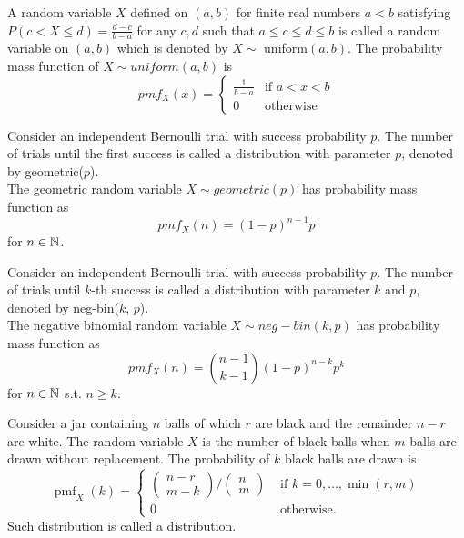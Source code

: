 \documentclass[11pt]{article}
\begin{document}
A random variable $X$ defined on $(a,b)$ for finite real numbers $a < b$ satisfying $P(c < X \leq d) = \frac{d-c}{b-a}$ for any $c,d$ such that $a\leq c \leq d\leq b$ is called a  random variable on $(a,b)$ which is denoted by $X \sim$ uniform$(a,b)$.
The probability mass function of $X \sim uniform(a,b)$ is
$$pmf_X(x) = \begin{cases}
	\frac{1}{b-a} &\text{if $a < x<b$} \\
	0 &\text{otherwise}
\end{cases} $$

Consider an independent Bernoulli trial with success probability $p$. The number of trials until the first success is called a  distribution with parameter $p$, denoted by geometric($p$). \\
The geometric random variable $X \sim geometric(p)$ has probability mass function as
$$pmf_X(n) = (1-p)^{n-1}p$$
for $n \in \mathbb{N}$.



Consider an independent Bernoulli trial with success probability $p$. The number of trials until $k$-th success is called a  distribution with parameter $k$ and $p$, denoted by neg-bin($k$, $p$).\\
The negative binomial random variable $X \sim neg-bin(k, p)$ has probability mass function as
$$pmf_X(n) = {n-1 \choose k-1}(1-p)^{n-k}p^k$$
for $n \in \mathbb{N}$ s.t. $n \geq k$.

Consider a jar containing \(n\) balls of which \(r\) are black and the remainder \(n-r\) are white.
The random variable \(X\) is the number of black balls when \(m\) balls are drawn without
replacement. The probability of \(k\) black balls are drawn is
$$
\operatorname{pmf}_{X}(k)=\left\{\begin{array}{cc}{\left(\begin{array}{c}{n-r} \\ {m-k}\end{array}\right) /\left(\begin{array}{c}{n} \\ {m}\end{array}\right)} & {\text { if } k=0, \ldots, \min (r, m)} \\ {0} & {\text { otherwise. }}\end{array}\right.
$$
Such distribution is called a  distribution.
\end{document}

